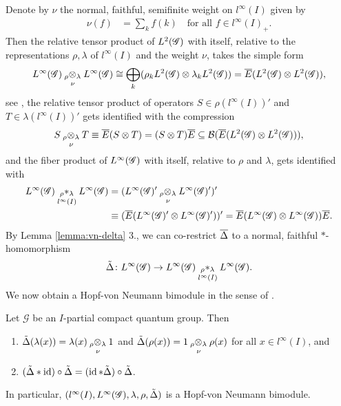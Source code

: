 Denote by $\nu$ the
normal, faithful, semifinite weight on $l^{\infty}(I)$ given by
\begin{align} \label{eq:vn-nu}
  \nu(f) &=\sum_{k} f(k) \quad \text{for all } f\in l^{\infty}(I)_{+}.
\end{align}
Then the relative tensor product of $L^{2}(\mathscr{G})$ with itself,
relative to the representations $\rho,\lambda$ of $l^{\infty}(I)$ and
the weight $\nu$, takes the simple form
\begin{align*}
L^{\infty}(\mathscr{G}) \underset{\nu{}}{_{\rho}\otimes_{\lambda}} L^{\infty}(\mathscr{G}) \cong
  \bigoplus_{k} (\rho_{k}L^{2}(\mathscr{G}) \otimes \lambda_{k}L^{2}(\mathscr{G})) =
  \overline{E}(L^{2}(\mathscr{G}) \otimes L^{2}(\mathscr{G})),
\end{align*}
see \cite{},  the relative tensor product
of operators $S\in \rho(l^{\infty}(I))'$ and $T \in
\lambda(l^{\infty}(I))'$ gets identified with the compression
\begin{align*}
S \underset{\nu{}}{_{\rho}\otimes_{\lambda}} T \equiv
  \overline{E}(S \otimes
  T) = (S \otimes T)\overline{E} \subseteq {\cal B}(\overline{E}(L^{2}(\mathscr{G})
  \otimes L^{2}(\mathscr{G}))),
\end{align*}
and the fiber product of  $  L^{\infty}(\mathscr{G})$ with itself, relative to $\rho$
and $\lambda$,  gets identified with
\begin{align} \label{eq:vn-fiber}
  \begin{aligned}
    L^{\infty}(\mathscr{G}) \underset{l^{\infty}(I)}{_{\rho}\ast_{\lambda}} L^{\infty}(\mathscr{G}) &= (L^{\infty}(\mathscr{G})' \underset{\nu{}}{_{\rho}\otimes_{\lambda}} L^{\infty}(\mathscr{G})')' \\ &\equiv
    (\overline{E}(L^{\infty}(\mathscr{G})' \otimes L^{\infty}(\mathscr{G})'))' = \overline{E}(L^{\infty}(\mathscr{G}) \otimes
    L^{\infty}(\mathscr{G}))\overline{E}.
  \end{aligned}
\end{align} 
By Lemma \ref{lemma:vn-delta} 3., we can co-restrict $\overline{\Delta}$ to  a
normal, faithful $*$-homomorphism
\begin{align*}
  \tilde\Delta \colon L^{\infty}(\mathscr{G}) \to   L^{\infty}(\mathscr{G}) \underset{l^{\infty}(I)}{_{\rho}\ast_{\lambda}} L^{\infty}(\mathscr{G}).
\end{align*}
We now obtain a Hopf-von Neumann bimodule in the
sense of \cite{}.
\begin{Prop}
  Let $\mathscr{G}$ be an $I$-partial compact quantum group. Then
  \begin{enumerate}
  \item $\tilde\Delta(\lambda(x)) = \lambda(x) \underset{\nu{}}{_{\rho}\otimes_{\lambda}} 1$ and
    $\tilde\Delta(\rho(x)) = 1 \underset{\nu{}}{_{\rho}\otimes_{\lambda}} \rho(x)$ for all $x\in
    l^{\infty}(I)$, and
  \item $(\tilde\Delta \ast \operatorname{id})\circ \tilde\Delta = (\operatorname{id} \ast \tilde\Delta)
    \circ \tilde\Delta$.
  \end{enumerate}
  In particular, $(l^{\infty}(I),L^{\infty}(\mathscr{G}), \lambda,\rho,\tilde\Delta)$ is a
  Hopf-von Neumann bimodule.
\end{Prop}
